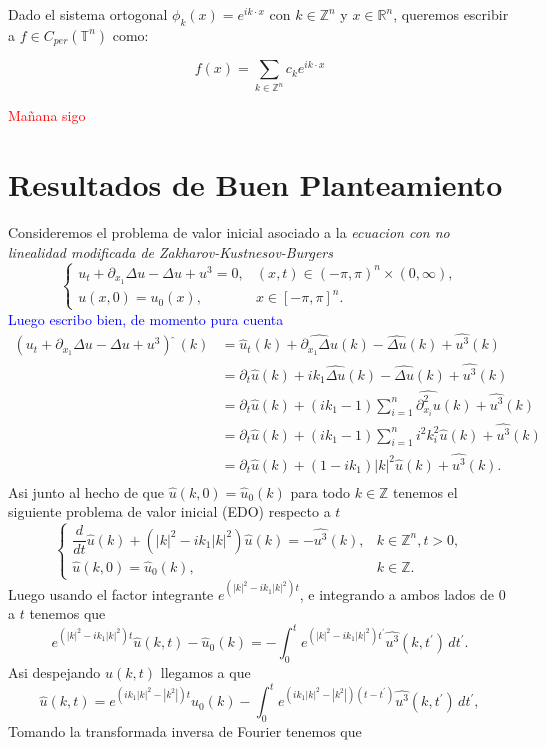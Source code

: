 \documentclass[12pt]{article}
\newcommand\R{\ensuremath{\mathbb{R}}}
\newcommand\Z{\ensuremath{\mathbb{Z}}}
\begin{document}
Dado el sistema ortogonal $\phi_k(x)=e^{ik\cdot x}$ con $k\in \Z^n$  y $x\in \R^n$, queremos escribir a $f\in C_{per}(\mathbb{T}^n)$ como:

$$f(x)=\sum_{k\in \Z^n}c_ke^{ik\cdot x}$$

\textcolor{red}{Mañana sigo}

\section{Resultados de Buen Planteamiento}

Consideremos el problema de valor inicial asociado a la \textit{ecuacion con no linealidad modificada de Zakharov-Kustnesov-Burgers}
$$\begin{cases}
    u_t+\partial_{x_1}\Delta u-\Delta u+u^3=0, & (x,t)\in(-\pi,\pi)^n\times(0,\infty),\\
    u(x,0)=u_0(x), & x\in[-\pi,\pi]^n.
\end{cases}$$
\textcolor{blue}{Luego escribo bien, de momento pura cuenta}
\begin{align*}
   (u_t+\partial_{x_1}\Delta u-\Delta u+u^3)\hat{\phantom{i}}(k)&= \widehat{u}_t(k)+\widehat{\partial_{x_1}\Delta u}(k)-\widehat{\Delta u}(k)+\widehat{u^3}(k)\\
   &=\partial_t\widehat{u}(k)+ik_1\widehat{\Delta u}(k)-\widehat{\Delta u}(k)+\widehat{u^3}(k)\\
   &=\partial_t\widehat{u}(k)+(ik_1-1)\sum_{i=1}^n\widehat{\partial^2_{x_i}u}(k)+\widehat{u^3}(k)\\
   &=\partial_t\widehat{u}(k)+(ik_1-1)\sum_{i=1}^ni^2k_i^2\widehat{u}(k)+\widehat{u^3}(k)\\
   &=\partial_t\widehat{u}(k)+(1-ik_1)|k|^2\widehat{u}(k)+\widehat{u^3}(k).\\
\end{align*}
Asi junto al hecho de que $\widehat{u}(k,0)=\widehat{u}_0(k)$ para todo $k\in\Z$ tenemos el siguiente problema de valor inicial (EDO) respecto a $t$
$$\begin{cases}
    \dfrac{d}{dt}\widehat{u}(k)+(|k|^2-ik_1|k|^2)\widehat{u}(k)=-\widehat{u^3}(k), & k\in\Z^n,t>0,\\
    \widehat{u}(k,0)=\widehat{u}_0(k), &k\in\Z.
\end{cases}$$
Luego usando el factor integrante $e^{(|k|^2-ik_1|k|^2)t}$, e integrando a ambos lados de 0 a $t$ tenemos que
$$e^{(|k|^2-ik_1|k|^2)t}\widehat{u}(k,t)-\widehat{u}_0(k)=-\int_0^te^{(|k|^2-ik_1|k|^2)t^\prime}\widehat{u^3}(k,t^\prime)\,dt^\prime.$$
Asi despejando $\widehat{u}(k,t)$ llegamos a que
$$\widehat{u}(k,t)=e^{(ik_1|k|^2-|k^2|)t}\widehat{u}_0(k)-\int_0^te^{(ik_1|k|^2-|k^2|)(t-t^\prime)}\widehat{u^3}(k,t^\prime)\,dt^\prime,$$
Tomando la transformada inversa de Fourier tenemos que

\newpage



\nocite{*}
\end{document}

